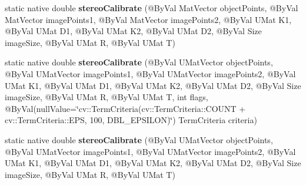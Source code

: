 \begin{DoxyCompactItemize}
\item 
static native double {\bfseries stereo\+Calibrate} (@By\+Val Mat\+Vector object\+Points, @By\+Val Mat\+Vector image\+Points1, @By\+Val Mat\+Vector image\+Points2, @By\+Val U\+Mat K1, @By\+Val U\+Mat D1, @By\+Val U\+Mat K2, @By\+Val U\+Mat D2, @By\+Val Size image\+Size, @By\+Val U\+Mat R, @By\+Val U\+Mat T)
\item 
static native double {\bfseries stereo\+Calibrate} (@By\+Val U\+Mat\+Vector object\+Points, @By\+Val U\+Mat\+Vector image\+Points1, @By\+Val U\+Mat\+Vector image\+Points2, @By\+Val U\+Mat K1, @By\+Val U\+Mat D1, @By\+Val U\+Mat K2, @By\+Val U\+Mat D2, @By\+Val Size image\+Size, @By\+Val U\+Mat R, @By\+Val U\+Mat T, int flags, @By\+Val(null\+Value=\char`\"{}cv\+::\+Term\+Criteria(cv\+::\+Term\+Criteria\+::\+C\+O\+U\+NT + cv\+::\+Term\+Criteria\+::\+E\+PS, 100, D\+B\+L\+\_\+\+E\+P\+S\+I\+L\+ON)\char`\"{}) Term\+Criteria criteria)
\item 
static native double {\bfseries stereo\+Calibrate} (@By\+Val U\+Mat\+Vector object\+Points, @By\+Val U\+Mat\+Vector image\+Points1, @By\+Val U\+Mat\+Vector image\+Points2, @By\+Val U\+Mat K1, @By\+Val U\+Mat D1, @By\+Val U\+Mat K2, @By\+Val U\+Mat D2, @By\+Val Size image\+Size, @By\+Val U\+Mat R, @By\+Val U\+Mat T)
\end{DoxyCompactItemize}
